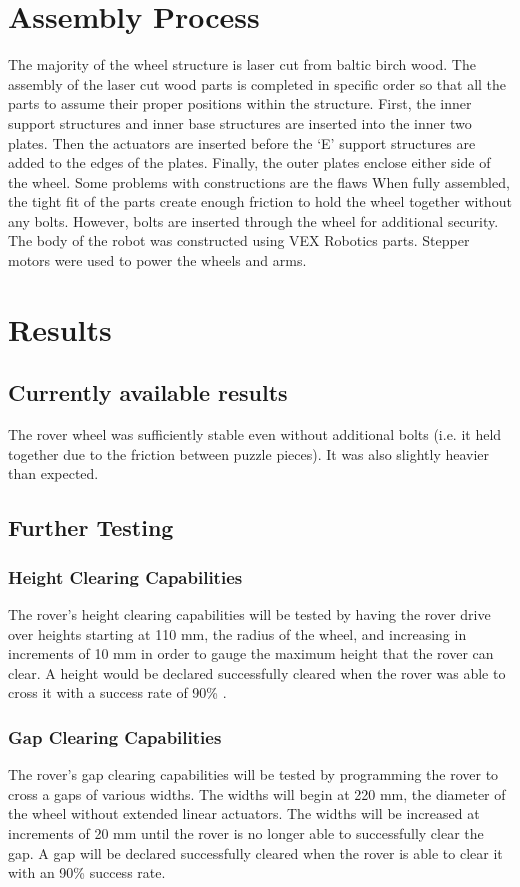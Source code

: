\documentclass[12pt]{article}
\numberwithin{figure}{section}
\begin{document}
\begin{multicols}{2}
\section{Assembly Process}
The majority of the wheel structure is laser cut from baltic birch wood. The assembly of the laser cut wood parts is completed in specific order so that all the parts to assume their proper positions within the structure. First, the inner support structures and inner base structures are inserted into the inner two plates. Then the actuators are inserted before the ‘E’ support structures are added to the edges of the plates. Finally, the outer plates enclose either side of the wheel.  Some problems with constructions are the flaws  When fully assembled, the tight fit of the parts create enough friction to hold the wheel together without any bolts. However, bolts are inserted through the wheel for additional security. The body of the robot was constructed using VEX Robotics parts. Stepper motors were used to power the wheels and arms. 

\section{Results}
\subsection{Currently available results}
The rover wheel was sufficiently stable even without additional bolts (i.e. it held together due to the friction between puzzle pieces). It was also slightly heavier than expected. 
\subsection{Further Testing}
\subsubsection{Height Clearing Capabilities}
The rover’s height clearing capabilities will be tested by having the rover drive over heights starting at 110 mm, the radius of the wheel, and increasing in increments of 10 mm in order to gauge the maximum height that the rover can clear. A height would be declared successfully cleared when the rover was able to cross it with a success rate of 90\% .
\subsubsection{Gap Clearing Capabilities}
The rover’s gap clearing capabilities will be tested by programming the rover to cross a gaps of various widths. The widths will begin at 220 mm, the diameter of the wheel without extended linear actuators. The widths will be increased at increments of 20 mm until the rover is no longer able to successfully clear the gap. A gap will be declared successfully cleared when the rover is able to clear it with an 90\% success rate. 

\end{multicols}
\end{document}

